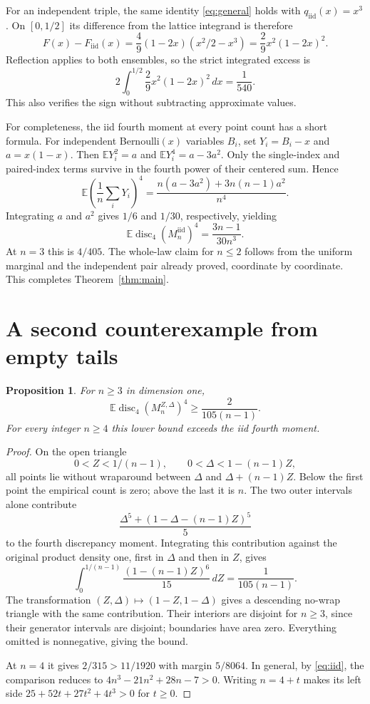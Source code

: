 \documentclass[11pt]{article}
\newtheorem{proposition}[theorem]{Proposition}
\newcommand{\E}{\mathbb E}
\newcommand{\disc}{\operatorname{disc}}
\newcommand{\iid}{\mathrm{iid}}
\begin{document}
For an independent triple, the same identity \eqref{eq:general} holds
with $q_\iid(x)=x^3$. On $[0,1/2]$ its difference from the lattice
integrand is therefore
\[
 F(x)-F_\iid(x)
 =\frac49(1-2x)(x^2/2-x^3)
 =\frac29x^2(1-2x)^2 .
\]
Reflection applies to both ensembles, so the strict integrated excess is
\[
 2\int_0^{1/2}\frac29x^2(1-2x)^2\,dx=\frac1{540}.
\]
This also verifies the sign without subtracting approximate values.

For completeness, the iid fourth moment at every point count has a short
formula. For independent Bernoulli$(x)$ variables $B_i$, set $Y_i=B_i-x$
and $a=x(1-x)$. Then $\E Y_i^2=a$ and $\E Y_i^4=a-3a^2$.
Only the single-index and paired-index terms survive in the fourth
power of their centered sum. Hence
\[
 \E\left(\frac1n\sum_iY_i\right)^4
 =\frac{n(a-3a^2)+3n(n-1)a^2}{n^4}.
\]
Integrating $a$ and $a^2$ gives $1/6$ and $1/30$, respectively, yielding
\begin{equation}\label{eq:iid}
 \E\disc_4(M_n^\iid)^4=\frac{3n-1}{30n^3}.
\end{equation}
At $n=3$ this is $4/405$. The whole-law claim for $n\le2$ follows
from the uniform marginal and the independent pair already proved,
coordinate by coordinate. This completes Theorem~\ref{thm:main}.

\section{A second counterexample from empty tails}
\begin{proposition}\label{prop:tails}
For $n\ge3$ in dimension one,
\[
 \E\disc_4(M_n^{Z,\Delta})^4\ge\frac2{105(n-1)}.
\]
For every integer $n\ge4$ this lower bound exceeds the iid fourth moment.
\end{proposition}
\begin{proof}
On the open triangle
\[
 0<Z<1/(n-1),\qquad 0<\Delta<1-(n-1)Z,
\]
all points lie without wraparound between $\Delta$ and
$\Delta+(n-1)Z$. Below the first point the empirical count is zero;
above the last it is $n$. The two outer intervals alone contribute
\[
 \frac{\Delta^5+(1-\Delta-(n-1)Z)^5}{5}
\]
to the fourth discrepancy moment. Integrating this contribution against
the original product density one, first in $\Delta$ and then in $Z$, gives
\[
 \int_0^{1/(n-1)}\frac{(1-(n-1)Z)^6}{15}\,dZ
 =\frac1{105(n-1)} .
\]
The transformation $(Z,\Delta)\mapsto(1-Z,1-\Delta)$ gives a descending
no-wrap triangle with the same contribution. Their interiors are disjoint
for $n\ge3$, since their generator intervals are disjoint; boundaries
have area zero. Everything omitted is nonnegative, giving the bound.

At $n=4$ it gives $2/315>11/1920$ with margin $5/8064$.
In general, by \eqref{eq:iid}, the comparison reduces to
$4n^3-21n^2+28n-7>0$. Writing $n=4+t$ makes its left side
$25+52t+27t^2+4t^3>0$ for $t\ge0$.
\end{proof}
\end{document}
